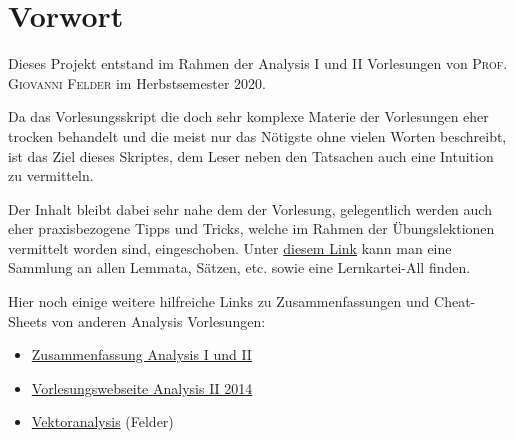 \chapter*{Vorwort}
Dieses Projekt entstand im Rahmen der Analysis I und II Vorlesungen von \textsc{Prof. Giovanni Felder} im Herbstsemester 2020. 

Da das Vorlesungsskript \cite{Vorlesungsskript} die doch sehr komplexe Materie der Vorlesungen eher trocken behandelt und die \cite{Vorlesungsnotizen} meist nur das Nötigste ohne vielen Worten beschreibt, ist das Ziel dieses Skriptes, dem Leser neben den Tatsachen auch eine Intuition zu vermitteln.

Der Inhalt bleibt dabei sehr nahe dem der Vorlesung, gelegentlich werden auch eher praxisbezogene Tipps und Tricks, welche im Rahmen der Übungslektionen vermittelt worden sind, eingeschoben. 
Unter \href{https://janiks.me/projects/eth/ana/list}{diesem Link} kann man eine Sammlung an allen Lemmata, Sätzen, etc. sowie eine Lernkartei-All finden.

Hier noch einige weitere hilfreiche Links zu Zusammenfassungen und Cheat-Sheets von anderen Analysis Vorlesungen:
\begin{itemize}
    \item \href{https://people.math.ethz.ch/~struwe/Skripten/Analysis-I-II-final-6-9-2012.pdf}{Zusammenfassung Analysis I und II}
    \item \href{https://www2.math.ethz.ch/education/bachelor/lectures/fs2014/math/analysis2.html}{Vorlesungswebseite Analysis II 2014}
    \item \href{http://citeseerx.ist.psu.edu/viewdoc/download?doi=10.1.1.621.6146&rep=rep1&type=pdf}{Vektoranalysis} (Felder)
\end{itemize}
